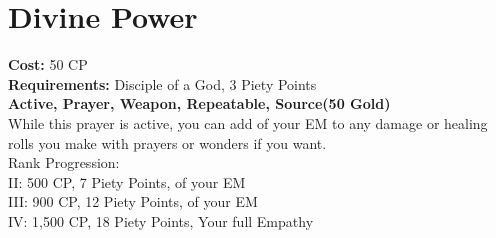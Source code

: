 \section{Divine Power}\label{prayer:divinePower}
\textbf{Cost:} 50 CP\\
\textbf{Requirements:} Disciple of a God, 3 Piety Points \\
\textbf{Active, Prayer, Weapon, Repeatable, Source(50 Gold)}\\
While this prayer is active, you can add  of your EM to any damage or healing rolls you make with prayers or wonders if you want.
\\
Rank Progression:\\
II: 500 CP, 7 Piety Points,  of your EM\\
III: 900 CP, 12 Piety Points,  of your EM\\
IV: 1,500 CP, 18 Piety Points, Your full Empathy\\